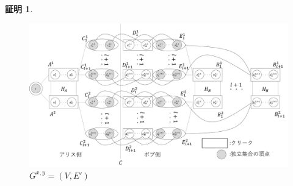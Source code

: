 \documentclass[12pt]{thesis}
\theoremstyle{definition}
\newtheorem*{prf*}{証明}
\begin{document}
\begin{prf*}
\begin{figure}[ht]
\begin{center}
\includegraphics[width=120mm]{k_Gxy.png}
\end{center}
\caption{$G^{x, y} = (V, E')$}
\label{k_Gxy}
\end{figure}


\end{prf*}
\end{document}
